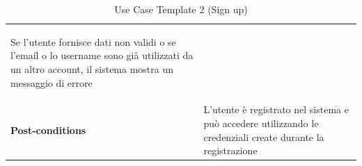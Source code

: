 \documentclass{article}
\begin{document}
\begin{table}
\begin{tabularx}{\textwidth}{|lX|}
\begin{description}[nosep,before=\leavevmode\vspace*{-1\baselineskip},after=\leavevmode\vspace*{-1\baselineskip}]
                                                                        \item [3a.] Se l'utente fornisce dati non validi o se l'email o lo username sono già utilizzati da un altro account, il sistema mostra un messaggio di errore
                                                                    \end{description} \\
                    \rowcolor{white} \textbf{Post-conditions} & L'utente è registrato nel sistema e può accedere utilizzando le credenziali create durante la registrazione \\
                    \toprule
                \end{tabularx}
                \caption{Use Case Template 2 (Sign up)}
                \label{tab:use-case-template-2}
            \end{table}
\end{document}
